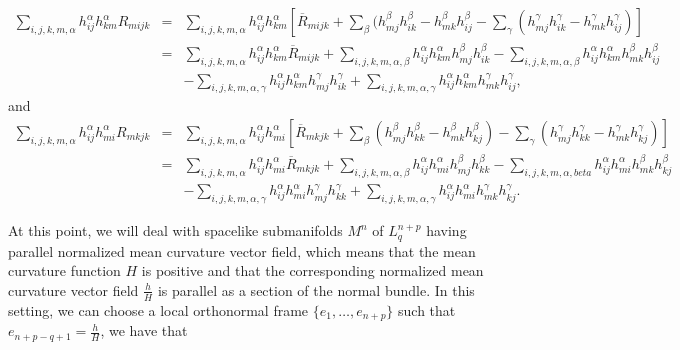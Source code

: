 \documentclass[leqno,11pt]{amsart}
\theoremstyle{plain}
\theoremstyle{definition}
\numberwithin{equation}{section}
\begin{document}
\begin{eqnarray*}
\sum_{i,j,k,m,\alpha}h_{ij}^{\alpha}h_{km}^{\alpha}R_{mijk}&=&\sum_{i,j,k,m,\alpha}h_{ij}^{\alpha}h_{km}^{\alpha}\left[\overline{R}_{mijk}+\sum_{\beta}(h_{mj}^{\beta}h_{ik}^{\beta}-h_{mk}^{\beta}h_{ij}^{\beta}-\sum_{\gamma}(h_{mj}^{\gamma}h_{ik}^{\gamma}-h_{mk}^{\gamma}h_{ij}^{\gamma})\right]\\
&=&\sum_{i,j,k,m,\alpha}h_{ij}^{\alpha}h_{km}^{\alpha}\overline{R}_{mijk}+\sum_{i,j,k,m,\alpha,\beta}h_{ij}^{\alpha}h_{km}^{\alpha}h_{mj}^{\beta}h_{ik}^{\beta}-\sum_{i,j,k,m,\alpha,\beta}h_{ij}^{\alpha}h_{km}^{\alpha}h_{mk}^{\beta}h_{ij}^{\beta}\\
&&- \sum_{i,j,k,m,\alpha,\gamma}h_{ij}^{\alpha}h_{km}^{\alpha}h_{mj}^{\gamma}h_{ik}^{\gamma}+\sum_{i,j,k,m,\alpha,\gamma}h_{ij}^{\alpha}h_{km}^{\alpha}h_{mk}^{\gamma}h_{ij}^{\gamma},
\end{eqnarray*}
and 
\begin{eqnarray*}
\sum_{i,j,k,m,\alpha}h_{ij}^{\alpha}h_{mi}^{\alpha}R_{mkjk}&=&\sum_{i,j,k,m,\alpha}h_{ij}^{\alpha}h_{mi}^{\alpha}\left[\overline{R}_{mkjk}+\sum_{\beta}(h_{mj}^{\beta}h_{kk}^{\beta}-h_{mk}^{\beta}h_{kj}^{\beta})-\sum_{\gamma}(h_{mj}^{\gamma}h_{kk}^{\gamma}-h_{mk}^{\gamma}h_{kj}^{\gamma})\right]\\
&=&\sum_{i,j,k,m,\alpha}h_{ij}^{\alpha}h_{mi}^{\alpha}\overline{R}_{mkjk}+\sum_{i,j,k,m,\alpha,\beta}h_{ij}^{\alpha}h_{mi}^{\alpha}h_{mj}^{\beta}h_{kk}^{\beta} -\sum_{i,j,k,m,\alpha,beta}h_{ij}^{\alpha}h_{mi}^{\alpha}h_{mk}^{\beta}h_{kj}^{\beta} \\&&-\sum_{i,j,k,m,\alpha,\gamma}h_{ij}^{\alpha}h_{mi}^{\alpha}h_{mj}^{\gamma}h_{kk}^{\gamma} +\sum_{i,j,k,m,\alpha,\gamma}h_{ij}^{\alpha}h_{mi}^{\alpha}h_{mk}^{\gamma}h_{kj}^{\gamma}.
\end{eqnarray*}

At this point, we will deal with spacelike submanifolds $M^{n}$ of $L_{q}^{n+p}$ having parallel normalized mean curvature vector field, which means that the mean curvature function $H$ is positive and that the corresponding normalized mean curvature vector field $\frac{h}{H}$ is parallel as a section of the normal bundle. In this setting, we can choose a local orthonormal frame $\{e_{1},\ldots,e_{n+p}\}$ such that $e_{n+p-q+1}=\frac{h}{H}$, we have that
\end{document}
